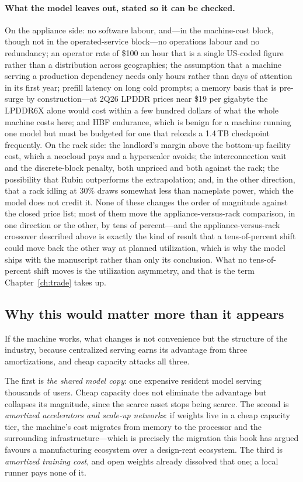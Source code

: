 \paragraph{What the model leaves out, stated so it can be checked.} On the appliance side: no software labour, and---in the machine-cost block, though not in the operated-service block---no operations labour and no redundancy; an operator rate of \$100 an hour that is a single US-coded figure rather than a distribution across geographies; the assumption that a machine serving a production dependency needs only hours rather than days of attention in its first year; prefill latency on long cold prompts; a memory basis that is pre-surge by construction---at 2Q26 LPDDR prices near \$19 per gigabyte the LPDDR6X alone would cost within a few hundred dollars of what the whole machine costs here; and HBF endurance, which is benign for a machine running one model but must be budgeted for one that reloads a 1.4\,TB checkpoint frequently. On the rack side: the landlord's margin above the bottom-up facility cost, which a neocloud pays and a hyperscaler avoids; the interconnection wait and the discrete-block penalty, both unpriced and both against the rack; the possibility that Rubin outperforms the extrapolation; and, in the other direction, that a rack idling at 30\% draws somewhat less than nameplate power, which the model does not credit it. None of these changes the order of magnitude against the closed price list; most of them move the appliance-versus-rack comparison, in one direction or the other, by tens of percent---and the appliance-versus-rack crossover described above is exactly the kind of result that a tens-of-percent shift could move back the other way at planned utilization, which is why the model ships with the manuscript rather than only its conclusion. What no tens-of-percent shift moves is the utilization asymmetry, and that is the term Chapter~\ref{ch:trade} takes up.

\subsection{Why this would matter more than it appears}
\label{sec:whymatters}

If the machine works, what changes is not convenience but the structure of the industry, because centralized serving earns its advantage from three amortizations, and cheap capacity attacks all three.

The first is \emph{the shared model copy}: one expensive resident model serving thousands of users. Cheap capacity does not eliminate the advantage but collapses its magnitude, since the scarce asset stops being scarce. The second is \emph{amortized accelerators and scale-up networks}: if weights live in a cheap capacity tier, the machine's cost migrates from memory to the processor and the surrounding infrastructure---which is precisely the migration this book has argued favours a manufacturing ecosystem over a design-rent ecosystem. The third is \emph{amortized training cost}, and open weights already dissolved that one; a local runner pays none of it.

